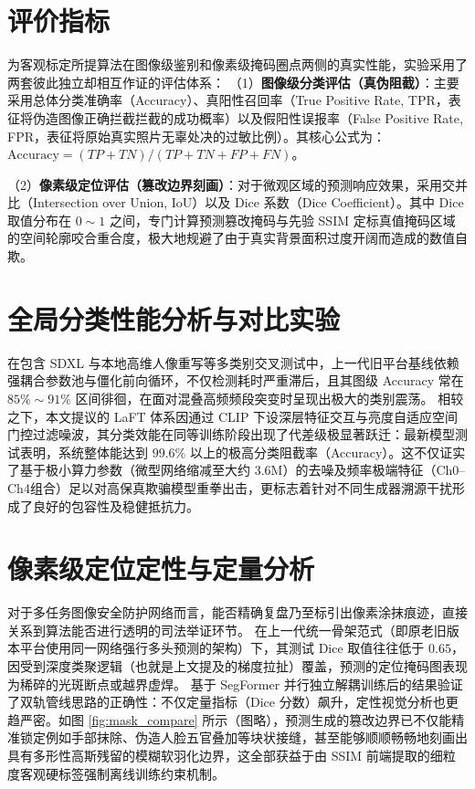 \documentclass[UTF8, a4paper, 12pt]{ctexrep}
\begin{document}
\section{评价指标}
为客观标定所提算法在图像级鉴别和像素级掩码圈点两侧的真实性能，实验采用了两套彼此独立却相互作证的评估体系：
（1）\textbf{图像级分类评估（真伪阻截）}：主要采用总体分类准确率（Accuracy）、真阳性召回率（True Positive Rate, TPR，表征将伪造图像正确拦截拦截的成功概率）以及假阳性误报率（False Positive Rate, FPR，表征将原始真实照片无辜处决的过敏比例）。其核心公式为：$\text{Accuracy} = (TP + TN)/(TP + TN + FP + FN)$。

（2）\textbf{像素级定位评估（篡改边界刻画）}：对于微观区域的预测响应效果，采用交并比（Intersection over Union, IoU）以及 Dice 系数（Dice Coefficient）。其中 Dice 取值分布在 $0 \sim 1$ 之间，专门计算预测篡改掩码与先验 SSIM 定标真值掩码区域的空间轮廓咬合重合度，极大地规避了由于真实背景面积过度开阔而造成的数值自欺。



\section{全局分类性能分析与对比实验}
在包含 SDXL 与本地高维人像重写等多类别交叉测试中，上一代旧平台基线依赖强耦合参数池与僵化前向循环，不仅检测耗时严重滞后，且其图级 Accuracy 常在 $85\% \sim 91\%$ 区间徘徊，在面对混叠高频频段突变时呈现出极大的类别震荡。
相较之下，本文提议的 LaFT 体系因通过 CLIP 下设深层特征交互与亮度自适应空间门控过滤噪波，其分类效能在同等训练阶段出现了代差级极显著跃迁：最新模型测试表明，系统整体能达到 $99.6\%$ 以上的极高分类阻截率（Accuracy）。这不仅证实了基于极小算力参数（微型网络缩减至大约 3.6M）的去噪及频率极端特征（Ch0--Ch4组合）足以对高保真欺骗模型重拳出击，更标志着针对不同生成器溯源干扰形成了良好的包容性及稳健抵抗力。

\section{像素级定位定性与定量分析}
对于多任务图像安全防护网络而言，能否精确复盘乃至标引出像素涂抹痕迹，直接关系到算法能否进行透明的司法举证环节。
在上一代统一骨架范式（即原老旧版本平台使用同一网络强行多头预测的架构）下，其测试 Dice 取值往往低于 $0.65$，因受到深度类聚逻辑（也就是上文提及的梯度拉扯）覆盖，预测的定位掩码图表现为稀碎的光斑断点或越界虚焊。
基于 SegFormer 并行独立解耦训练后的结果验证了双轨管线思路的正确性：不仅定量指标（Dice 分数）飙升，定性视觉分析也更趋严密。如图 \ref{fig:mask_compare} 所示（图略），预测生成的篡改边界已不仅能精准锁定例如手部抹除、伪造人脸五官叠加等块状接缝，甚至能够顺顺畅畅地刻画出具有多形性高斯残留的模糊软羽化边界，这全部获益于由 SSIM 前端提取的细粒度客观硬标签强制离线训练约束机制。
\end{document}

